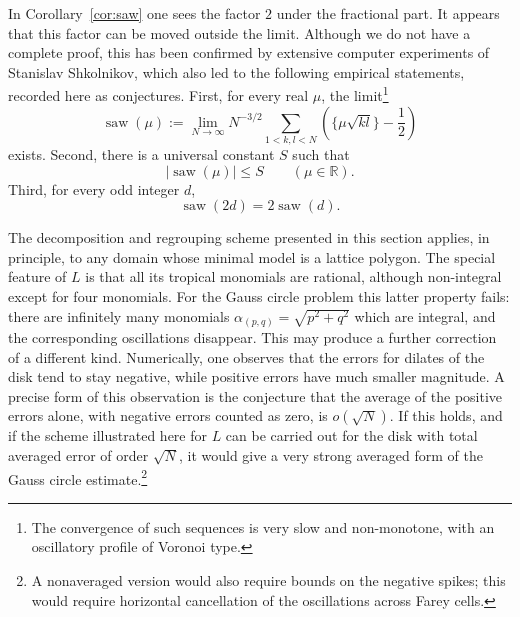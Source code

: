 \documentclass[a4paper,american,11pt]{amsart}
\theoremstyle{plain}
\theoremstyle{definition}
\newcommand{\R}{\mathbb R}
\begin{document}
In Corollary~\ref{cor:saw} one sees the factor \(2\) under the fractional
part. It appears that this factor can be moved outside the limit. Although we
do not have a complete proof, this has been confirmed by extensive computer
experiments of Stanislav Shkolnikov, which also led to the following
empirical statements, recorded here as conjectures. First, for every real
\(\mu\), the limit\footnote{The convergence of such sequences is very slow
and non-monotone, with an oscillatory profile of Voronoi type.}
\[
\operatorname{saw}(\mu)
:=
\lim_{N\to\infty}
N^{-3/2}\sum_{1<k,l<N}\left(\{\mu\sqrt{kl}\}-\frac12\right)
\]
exists. Second, there is a universal constant \(S\) such that
\[
|\operatorname{saw}(\mu)|\le S
\qquad
(\mu\in\R).
\]
Third, for every odd integer \(d\),
\[
\operatorname{saw}(2d)=2\operatorname{saw}(d).
\]

The decomposition and regrouping scheme presented in this section applies,
in principle, to any domain whose minimal model is a lattice polygon. The
special feature of \(L\) is that all its tropical monomials are rational,
although non-integral except for four monomials. For the Gauss circle problem
this latter property fails: there are infinitely many monomials
\(\alpha_{(p,q)}=\sqrt{p^2+q^2}\) which are integral, and the corresponding
oscillations disappear. This may produce a further correction of a different
kind. Numerically, one observes that the errors for dilates of the disk tend
to stay negative, while positive errors have much smaller magnitude. A precise
form of this observation is the conjecture that the average of the positive
errors alone, with negative errors counted as zero, is \(o(\sqrt N)\). If this
holds, and if the scheme illustrated here for \(L\) can be carried out for the
disk with total averaged error of order \(\sqrt N\), it would give a very
strong averaged form of the Gauss circle estimate.\footnote{A nonaveraged version would also require bounds on the negative spikes; this would require horizontal cancellation of the oscillations across Farey cells.}
\end{document}
